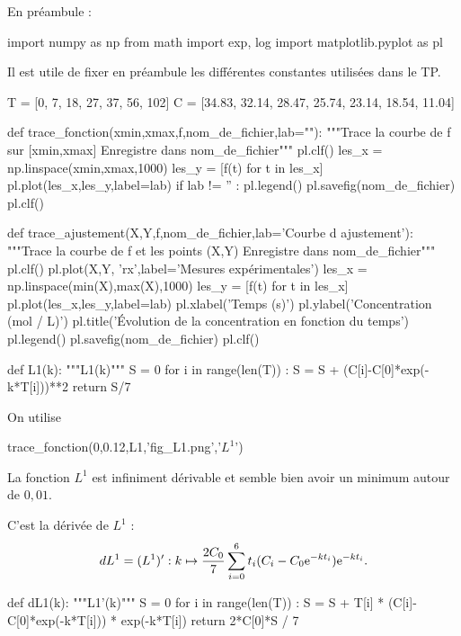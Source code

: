 En préambule : 
\begin{pyverbatim}
import numpy as np
from math import exp, log
import matplotlib.pyplot as pl
\end{pyverbatim}

Il est utile de fixer en préambule les différentes constantes utilisées dans le TP.
\begin{pyverbatim}
T = [0, 7, 18, 27, 37, 56, 102]
C = [34.83, 32.14, 28.47, 25.74, 23.14, 18.54, 11.04]
\end{pyverbatim}

\question{}
\begin{pyverbatim}
def trace_fonction(xmin,xmax,f,nom_de_fichier,lab=""):
    """Trace la courbe de f sur [xmin,xmax]
    Enregistre dans nom_de_fichier"""
    pl.clf()
    les_x = np.linspace(xmin,xmax,1000)
    les_y = [f(t) for t in les_x]
    pl.plot(les_x,les_y,label=lab)
    if lab != '' :
        pl.legend()
    pl.savefig(nom_de_fichier)
    pl.clf()
\end{pyverbatim}

\question{}
\begin{pyverbatim}
def trace_ajustement(X,Y,f,nom_de_fichier,lab='Courbe d ajustement'):
    """Trace la courbe de f et les points (X,Y)
    Enregistre dans nom_de_fichier"""
    pl.clf()
    pl.plot(X,Y, 'rx',label='Mesures expérimentales')
    les_x = np.linspace(min(X),max(X),1000)
    les_y = [f(t) for t in les_x]
    pl.plot(les_x,les_y,label=lab)
    pl.xlabel('Temps (s)')
    pl.ylabel('Concentration (mol / L)')
    pl.title('Évolution de la concentration en fonction du temps')
    pl.legend()
    pl.savefig(nom_de_fichier)
    pl.clf()
\end{pyverbatim}

\question{}
\begin{pyverbatim}
def L1(k):
    """L1(k)"""
    S = 0
    for i in range(len(T)) :
        S = S + (C[i]-C[0]*exp(-k*T[i]))**2
    return S/7
\end{pyverbatim}

\question{}
On utilise
\begin{pyverbatim}
trace_fonction(0,0.12,L1,'fig_L1.png','$L^1$')
\end{pyverbatim}
La fonction $L^1$ est infiniment dérivable et semble bien avoir un minimum autour de $0,01$.

\question{}
C'est la dérivée de $L^1$ : 
\begin{equation*}
  dL^1 = (L^1)' : k \mapsto \dfrac{2C_0}{7} \sum_{i=0}^6 t_i (C_i-C_0\mathrm{e}^{-kt_i})\mathrm{e}^{-kt_i}.
\end{equation*}
\begin{pyverbatim}
def dL1(k):
    """L1'(k)"""
    S = 0
    for i in range(len(T)) :
        S = S + T[i] * (C[i]-C[0]*exp(-k*T[i])) * exp(-k*T[i])
    return 2*C[0]*S / 7
\end{pyverbatim}

